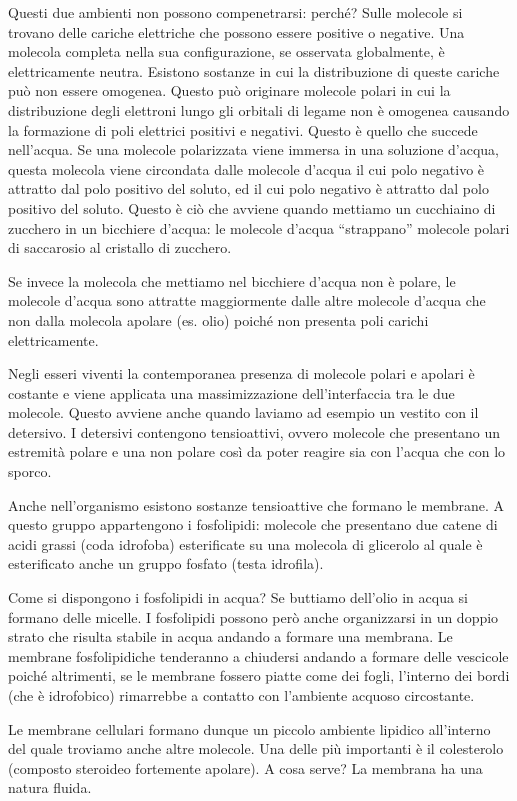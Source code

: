 \documentclass[]{article}
\begin{document}
Questi due ambienti non possono compenetrarsi: perché? Sulle molecole si
trovano delle cariche elettriche che possono essere positive o negative.
Una molecola completa nella sua configurazione, se osservata
globalmente, è elettricamente neutra. Esistono sostanze in cui la
distribuzione di queste cariche può non essere omogenea. Questo può
originare molecole polari in cui la distribuzione degli elettroni lungo
gli orbitali di legame non è omogenea causando la formazione di poli
elettrici positivi e negativi. Questo è quello che succede nell'acqua.
Se una molecole polarizzata viene immersa in una soluzione d'acqua,
questa molecola viene circondata dalle molecole d'acqua il cui polo
negativo è attratto dal polo positivo del soluto, ed il cui polo
negativo è attratto dal polo positivo del soluto. Questo è ciò che
avviene quando mettiamo un cucchiaino di zucchero in un bicchiere
d'acqua: le molecole d'acqua ``strappano'' molecole polari di saccarosio
al cristallo di zucchero.

Se invece la molecola che mettiamo nel bicchiere d'acqua non è polare,
le molecole d'acqua sono attratte maggiormente dalle altre molecole
d'acqua che non dalla molecola apolare (es. olio) poiché non presenta
poli carichi elettricamente.

Negli esseri viventi la contemporanea presenza di molecole polari e
apolari è costante e viene applicata una massimizzazione
dell'interfaccia tra le due molecole. Questo avviene anche quando
laviamo ad esempio un vestito con il detersivo. I detersivi contengono
tensioattivi, ovvero molecole che presentano un estremità polare e una
non polare così da poter reagire sia con l'acqua che con lo sporco.

Anche nell'organismo esistono sostanze tensioattive che formano le
membrane. A questo gruppo appartengono i fosfolipidi: molecole che
presentano due catene di acidi grassi (coda idrofoba) esterificate su
una molecola di glicerolo al quale è esterificato anche un gruppo
fosfato (testa idrofila).

Come si dispongono i fosfolipidi in acqua? Se buttiamo dell'olio in
acqua si formano delle micelle. I fosfolipidi possono però anche
organizzarsi in un doppio strato che risulta stabile in acqua andando a
formare una membrana. Le membrane fosfolipidiche tenderanno a chiudersi
andando a formare delle vescicole poiché altrimenti, se le membrane
fossero piatte come dei fogli, l'interno dei bordi (che è idrofobico)
rimarrebbe a contatto con l'ambiente acquoso circostante.

Le membrane cellulari formano dunque un piccolo ambiente lipidico
all'interno del quale troviamo anche altre molecole. Una delle più
importanti è il colesterolo (composto steroideo fortemente apolare). A
cosa serve? La membrana ha una natura fluida.
\end{document}
